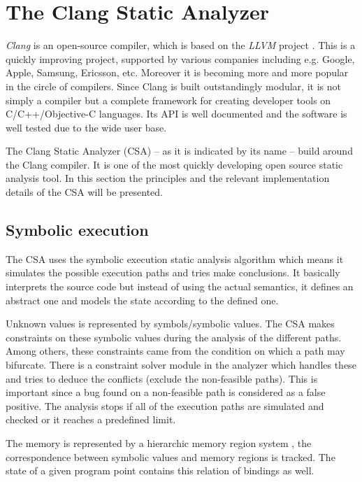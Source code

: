 \section{The Clang Static Analyzer}

\emph{Clang} is an open-source compiler, which is based on the \emph{LLVM} 
project \cite{lattner:clang}. This is a quickly improving project, 
supported by various companies including e.g. Google, Apple, Samsung, Ericsson, 
etc. Moreover it is becoming more and more popular in the circle of compilers. 
Since Clang is built outstandingly modular, it is not simply a compiler but a 
complete framework for creating developer tools on C/C++/Objective-C 
languages. Its API is well documented and the software is well tested due to 
the wide user base.


The Clang Static Analyzer (CSA) -- as it is indicated by its name -- build 
around the Clang compiler. It is one of the most quickly developing open source 
static analysis tool. In this section the principles and the relevant 
implementation details of the CSA will be presented.

\subsection{Symbolic execution}
The CSA uses the symbolic execution static analysis algorithm which means it 
simulates the possible execution paths and tries make conclusions. It basically 
interprets the source code but instead of using the actual semantics, it 
defines an abstract one and models the state according to the defined one.

Unknown values is represented by symbols/symbolic values. The CSA makes 
constraints on these symbolic values during the analysis of the different 
paths. Among others, these constraints came from the condition on which a path 
may bifurcate. There is a constraint solver module in the analyzer which 
handles these and tries to deduce the conflicts (exclude the non-feasible 
paths). This is important since a bug found on a non-feasible path is 
considered as a false positive. The analysis stops if all of the execution 
paths are simulated and checked or it reaches a predefined limit.

The memory is represented by a hierarchic memory region system 
\cite{clang:memmodel}, the correspondence between symbolic values and memory 
regions is tracked. The state of a given program point contains this relation 
of bindings as well.

